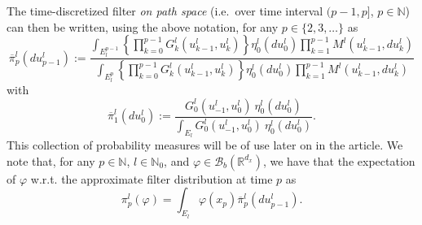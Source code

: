 \documentclass[english]{article}
\begin{document}
The time-discretized filter \emph{on path space} (i.e.~over time interval $(p-1,p]$, $p\in\mathbb{N}$) can then be written, using the above notation, for any $p\in\{2,3,\dots\}$ as
\begin{equation}\label{eq:path_filt}
\overline{\pi}_{p}^l(du_{p-1}^l) := \frac{\int_{E_l^{p-1}}\left\{\prod_{k=0}^{p-1}G_k^l(u_{k-1}^l,u_k^l)\right\}\eta_{0}^l(du_{0}^l)\prod_{k=1}^{p-1} M^{l}(u_{k-1}^l,du_{k}^l)}{\int_{E_l^{p}}\left\{\prod_{k=0}^{p-1}G_k^l(u_{k-1}^l,u_k^l)\right\}\eta_{0}^l(du_{0}^l)\prod_{k=1}^{p-1} M^{l}(u_{k-1}^l,du_{k}^l)}
\end{equation}
with 
$$
\overline{\pi}_{1}^l(du_0^l) := \frac{G_0^l(u_{-1}^l,u_0^l)~\eta_{0}^l(du_{0}^l)}{\int_{E_l}G_0^l(u_{-1}^l,u_0^l)~\eta_{0}^l(du_{0}^l)}.
$$
This collection of probability measures will be of use later on in the article.
We note that, for any $p\in\mathbb{N}$, $l\in \mathbb{N}_0$, and $\varphi\in\mathcal{B}_b(\mathbb{R}^{d_x})$, we have that the expectation of $\varphi$ w.r.t. the approximate filter distribution at time $p$ as
$$
\pi_p^l(\varphi) = \int_{E_l}\varphi(x_p)\overline{\pi}_{p}^l(du_{p-1}^l).
$$

\end{document}
